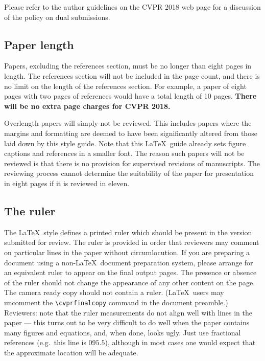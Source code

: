 \documentclass[10pt,twocolumn,letterpaper]{article}
\begin{document}
Please refer to the author guidelines on the CVPR 2018 web page for a
discussion of the policy on dual submissions.

\subsection{Paper length}
Papers, excluding the references section,
must be no longer than eight pages in length. The references section
will not be included in the page count, and there is no limit on the
length of the references section. For example, a paper of eight pages
with two pages of references would have a total length of 10 pages.
{\bf There will be no extra page charges for CVPR 2018.}

Overlength papers will simply not be reviewed.  This includes papers
where the margins and formatting are deemed to have been significantly
altered from those laid down by this style guide.  Note that this
\LaTeX\ guide already sets figure captions and references in a smaller font.
The reason such papers will not be reviewed is that there is no provision for
supervised revisions of manuscripts.  The reviewing process cannot determine
the suitability of the paper for presentation in eight pages if it is
reviewed in eleven.  

\subsection{The ruler}
The \LaTeX\ style defines a printed ruler which should be present in the
version submitted for review.  The ruler is provided in order that
reviewers may comment on particular lines in the paper without
circumlocution.  If you are preparing a document using a non-\LaTeX\
document preparation system, please arrange for an equivalent ruler to
appear on the final output pages.  The presence or absence of the ruler
should not change the appearance of any other content on the page.  The
camera ready copy should not contain a ruler. (\LaTeX\ users may uncomment
the \verb'\cvprfinalcopy' command in the document preamble.)  Reviewers:
note that the ruler measurements do not align well with lines in the paper
--- this turns out to be very difficult to do well when the paper contains
many figures and equations, and, when done, looks ugly.  Just use fractional
references (e.g.\ this line is $095.5$), although in most cases one would
expect that the approximate location will be adequate.
\end{document}
